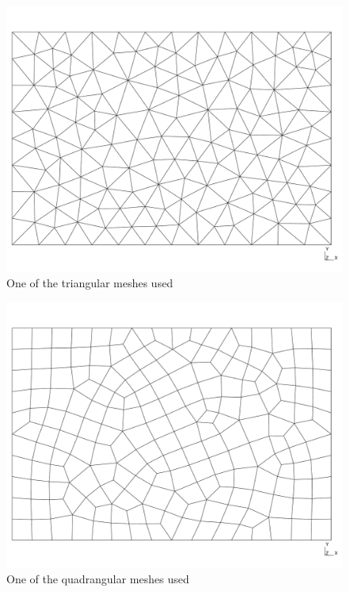 \documentclass[11pt]{article}
\begin{document}
\begin{figure}
	\centering
	\includegraphics[scale=0.25]{meshtri}
	\caption{One of the triangular meshes used}
\end{figure}
\begin{figure}
	\centering
	\includegraphics[scale=0.25]{meshquad}
	\caption{One of the quadrangular meshes used}
\end{figure}
\end{document}
